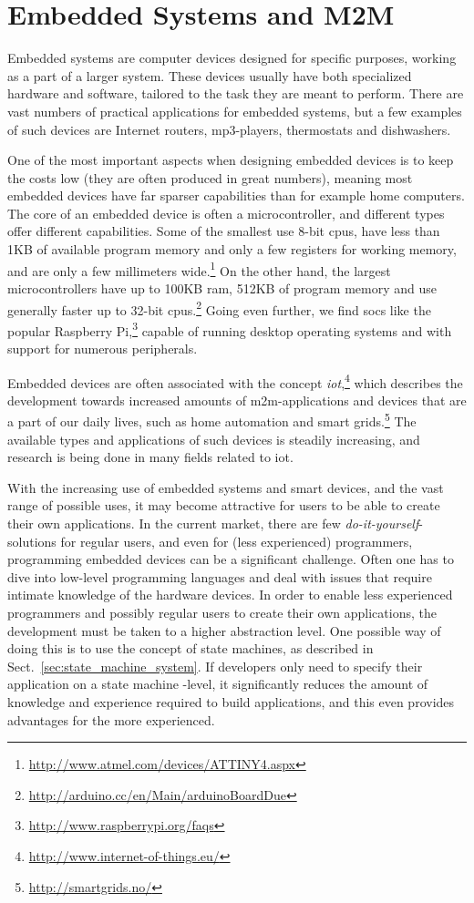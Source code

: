 \section{Embedded Systems and M2M}
\label{sec:embedded_m2m}
Embedded systems are computer devices designed for specific purposes, working as a part of a larger system. These devices usually have both specialized hardware and software, tailored to the task they are meant to perform. There are vast numbers of practical applications for embedded systems, but a few examples of such devices are Internet routers, mp3-players, thermostats and dishwashers.

\noindent
One of the most important aspects when designing embedded devices is to keep the costs low (they are often produced in great numbers), meaning most embedded devices have far sparser capabilities than for example home computers. The core of an embedded device is often a microcontroller, and different types offer different capabilities. Some of the smallest use 8-bit \glspl{cpu}, have less than 1KB of available program memory and only a few registers for working memory, and are only a few millimeters wide.\footnote{\url{http://www.atmel.com/devices/ATTINY4.aspx}} On the other hand, the largest microcontrollers have up to 100KB ram, 512KB of program memory and use generally faster up to 32-bit \glspl{cpu}.\footnote{\url{http://arduino.cc/en/Main/arduinoBoardDue}} Going even further, we find \glspl{soc} like the popular Raspberry Pi,\footnote{\url{http://www.raspberrypi.org/faqs}} capable of running desktop operating systems and with support for numerous peripherals.

\noindent
Embedded devices are often associated with the concept \emph{\gls{iot}},\footnote{\url{http://www.internet-of-things.eu/}} which describes the development towards increased amounts of \gls{m2m}-applications and devices that are a part of our daily lives, such as home automation and smart grids.\footnote{\url{http://smartgrids.no/}} The available types and applications of such devices is steadily increasing, and research is being done in many fields related to \gls{iot}.

\noindent
With the increasing use of embedded systems and smart devices, and the vast range of possible uses, it may become attractive for users to be able to create their own applications. In the current market, there are few \emph{do-it-yourself}-solutions for regular users, and even for (less experienced) programmers, programming embedded devices can be a significant challenge. Often one has to dive into low-level programming languages and deal with issues that require intimate knowledge of the hardware devices. In order to enable less experienced programmers and possibly regular users to create their own applications, the development must be taken to a higher abstraction level. One possible way of doing this is to use the concept of state machines, as described in Sect.~\ref{sec:state_machine_system}. If developers only need to specify their application on a state machine -level, it significantly reduces the amount of knowledge and experience required to build applications, and this even provides advantages for the more experienced.